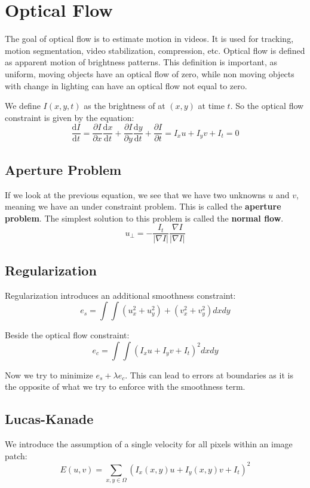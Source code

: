 \section{Optical Flow}

The goal of optical flow is to estimate motion in videos. It is used for tracking, motion segmentation, video stabilization, compression, etc. Optical flow is defined as apparent motion of brightness patterns. This definition is important, as uniform, moving objects have an optical flow of zero, while non moving objects with change in lighting can have an optical flow not equal to zero. \medskip

We define $I(x,y,t)$ as the brightness of at $(x,y)$ at time $t$. So the optical flow constraint is given by the equation:
$$\frac{\mathrm{d} I}{\mathrm{d} t} = \frac{\partial I}{\partial x} \frac{\mathrm{d} x}{\mathrm{d} t} + \frac{\partial I}{\partial y} \frac{\mathrm{d} y}{\mathrm{d} t} + \frac{\partial I}{\partial t} = I_x u + I_y v + I_t = 0$$


\subsection{Aperture Problem}

If we look at the previous equation, we see that we have two unknowns $u$ and $v$, meaning we have an under constraint problem. This is called the \textbf{aperture problem}. The simplest solution to this problem is called the \textbf{normal flow}.
$$u_\bot = - \frac{I_t}{|\nabla I|} \frac{\nabla I}{|\nabla I|}$$


\subsection{Regularization}

Regularization introduces an additional smoothness constraint:
$$e_s = \int \int (u_x^2 + u_y^2) + (v_x^2 + v_y^2) dxdy$$

Beside the optical flow constraint:
$$e_c = \int \int (I_x u + I_y v + I_t)^2 dx dy$$

Now we try to minimize $e_s + \lambda e_c$. This can lead to errors at boundaries as it is the opposite of what we try to enforce with the smoothness term.


\subsection{Lucas-Kanade}

We introduce the assumption of a single velocity for all pixels within an image patch:
$$E(u, v) = \sum_{x, y \in \Omega} \left( I_x(x, y)u + I_y(x, y)v + I_t \right)^2$$

